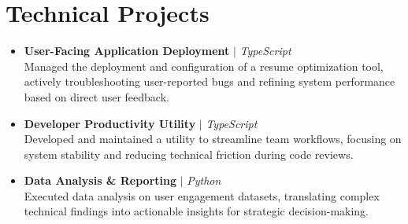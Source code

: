 \documentclass[10pt,letterpaper]{article}
\begin{document}
\section{Technical Projects}
\begin{itemize}[leftmargin=0.15in, label={}]
    \item \textbf{User-Facing Application Deployment} $|$ \textit{TypeScript} \\
    Managed the deployment and configuration of a resume optimization tool, actively troubleshooting user-reported bugs and refining system performance based on direct user feedback.
    \item \textbf{Developer Productivity Utility} $|$ \textit{TypeScript} \\
    Developed and maintained a utility to streamline team workflows, focusing on system stability and reducing technical friction during code reviews.
    \item \textbf{Data Analysis \& Reporting} $|$ \textit{Python} \\
    Executed data analysis on user engagement datasets, translating complex technical findings into actionable insights for strategic decision-making.
\end{itemize}
\end{document}

